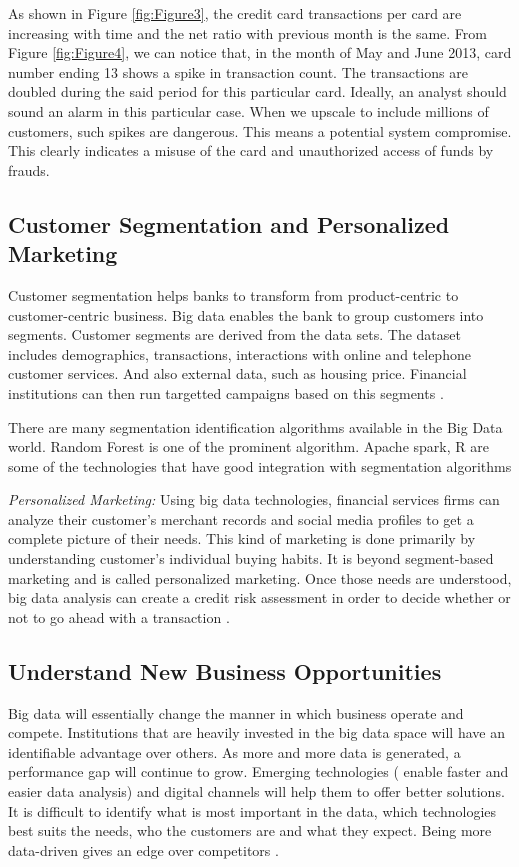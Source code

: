 \documentclass[sigconf]{acmart}
\begin{document}
As shown in Figure \ref{fig:Figure3}, the credit card transactions per card are increasing with time and the net ratio with previous month is the same.
From Figure \ref{fig:Figure4}, we can notice that, in the month of May and June 2013, card number ending 13 shows a spike in transaction count. The transactions are doubled during the said period for this particular card. Ideally, an analyst should sound an alarm in this particular case. When we upscale to include millions of customers, such spikes are dangerous. This means a potential system compromise. This clearly indicates a misuse of the card and unauthorized access of funds by frauds.



\subsection{Customer Segmentation and Personalized Marketing}

Customer segmentation helps banks to transform from product-centric to customer-centric business. Big data enables the bank to group customers into segments. Customer segments are derived from the data sets. The dataset includes demographics, transactions, interactions with online and telephone customer services. And also external data, such as housing price. Financial institutions can then run targetted campaigns based on this segments \cite{5-big-data-use-cases-in-banking-and-financial-services}.

There are many segmentation identification algorithms available in the Big Data world.  Random Forest is one of the prominent algorithm. Apache spark, R are some of the technologies that have good integration with segmentation algorithms

\textit{Personalized Marketing:} Using big data technologies, financial services firms can analyze their customer's merchant records and social media profiles to get a complete picture of their needs.  This kind of marketing is done primarily by understanding customer's individual buying habits. It is beyond segment-based marketing and is called personalized marketing. Once those needs are understood, big data analysis can create a credit risk assessment in order to decide whether or not to go ahead with a transaction \cite{5-big-data-use-cases-in-banking-and-financial-services}.

    
\subsection{Understand New Business Opportunities}
Big data will essentially change the manner in which business operate and compete. Institutions that are heavily invested in the big data space will have an identifiable advantage over others. As more and more data is generated, a performance gap will continue to grow. Emerging technologies ( enable faster and easier data analysis) and digital channels will help them to offer better solutions. It is difficult to identify what is most important in the data, which technologies best suits the needs, who the customers are and what they expect. Being more data-driven gives an edge over competitors \cite{bigdata-ey}.
\end{document}
